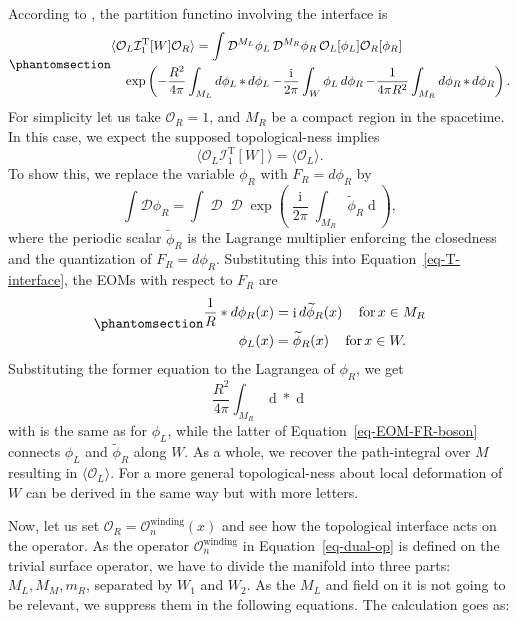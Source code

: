 \documentclass[11pt,toc=bibliography]{scrbook}
\DeclareMathOperator{\imunit}{i}
\numberwithin{equation}{section}
\DeclareMathOperator{\imunit}{i}
\begin{document}
According to \autocite{Kapustin:2009av}, the partition functino
involving the interface is
\begin{equation}\phantomsection\label{eq-T-interface}{
\begin{multlined}
\langle \mathcal{O}_L \mathcal{I}^\text{T}_1[W] \mathcal{O}_R  \rangle= 
\int \mathop{\mathcal{D}^{M_L}\phi_L}\mathop{\mathcal{D}^{M_R}\phi_R}
\mathcal{O}_L[\phi_L]\mathcal{O}_R[\phi_R]\\
\exp\left(-\frac{R^2}{4\pi}\int_{M_L}\mathop{d\phi_L}*\mathop{d\phi_L}
-\frac{\imunit}{2\pi}\int_W \phi_L\mathop{d\phi_R}
-\frac{1}{4\pi R^2}\int_{M_R}\mathop{d\phi_R}*\mathop{d\phi_R}\right).
\end{multlined}
}\end{equation} For simplicity let us take \(\mathcal{O}_R =1\), and
\(M_R\) be a compact region in the spacetime. In this case, we expect
the supposed topological-ness implies \[
\langle \mathcal{O}_L \mathcal{I}_1^\text{T}[W]\rangle = \langle \mathcal{O}_L \rangle.
\] To show this, we replace the variable \(\phi_R\) with
\(F_R = d\phi_R\) by \[
\int \mathcal{D}\phi_R = \int \mathop{\mathcal{D}F_R} \mathop{\mathcal{D}\widetilde{\phi}_R}
\exp\left(\frac{\imunit}{2\pi} \int_{M_R}\widetilde{\phi}_R \mathop{dF_R}\right),
\] where the periodic scalar \(\widetilde{\phi}_R\) is the Lagrange
multiplier enforcing the closedness and the quantization of
\(F_R = d\phi_R\). Substituting this into Equation~\ref{eq-T-interface},
the EOMs with respect to \(F_R\) are
\begin{equation}\phantomsection\label{eq-EOM-FR-boson}{
\begin{aligned}
    \frac{1}{R} *d\phi_R(x) &= \imunit d\widetilde\phi_R(x) \quad \mathop{\text{for}} x \in M_R \\
    \phi_L(x) &= \widetilde{\phi}_R(x) \quad \mathop{\text{for}} x \in W.
\end{aligned}
}\end{equation} Substituting the former equation to the Lagrangea of
\(\phi_R\), we get \[
    \frac{R^2}{4\pi} \int_{M_R}\mathop{d\widetilde{\phi}_R}*\mathop{d\widetilde{\phi}_R}
\] with is the same as for \(\phi_L\), while the latter of
Equation~\ref{eq-EOM-FR-boson} connects \(\phi_L\) and
\(\widetilde{\phi}_R\) along \(W\). As a whole, we recover the
path-integral over \(M\) resulting in \(\langle \mathcal{O}_L \rangle\).
For a more general topological-ness about local deformation of \(W\) can
be derived in the same way but with more letters.

Now, let us set \(\mathcal{O}_R = \mathcal{O}^\text{winding}_n(x)\) and
see how the topological interface acts on the operator. As the operator
\(\mathcal{O}^\text{winding}_n\) in Equation~\ref{eq-dual-op} is defined
on the trivial surface operator, we have to divide the manifold into
three parts: \(M_L,M_M,m_R\), separated by \(W_1\) and \(W_2\). As the
\(M_L\) and field on it is not going to be relevant, we suppress them in
the following equations. The calculation goes as:
\end{document}
